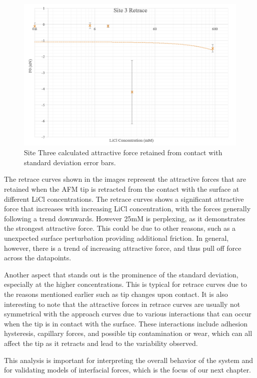 \begin{figure}
    \centering
    \includegraphics[width=1\linewidth]{chapter6/Overall/Site 3.png}
    \caption{Site Three calculated attractive force retained from contact with standard deviation error bars.}
    \label{fig:site3cont}
\end{figure}

The retrace curves shown in the images represent the attractive forces that are retained when the AFM tip is retracted from the contact with the surface at different LiCl concentrations. The retrace curves shows a significant attractive force that increases with increasing LiCl concentration, with the forces generally following a trend downwards. However 25mM is perplexing, as it demonstrates the strongest attractive force. This could be due to other reasons, such as a unexpected surface perturbation providing additional friction. In general, however, there is a trend of increasing attractive force, and thus pull off force across the datapoints.

Another aspect that stands out is the prominence of the standard deviation, especially at the higher concentrations. This is typical for retrace curves due to the reasons mentioned earlier such as tip changes upon contact. It is also interesting to note that the attractive forces in retrace curves are usually not symmetrical with the approach curves due to various interactions that can occur when the tip is in contact with the surface. These interactions include adhesion hysteresis, capillary forces, and possible tip contamination or wear, which can all affect the tip as it retracts and lead to the variability observed.

This  analysis is important for interpreting the overall behavior of the system and for validating models of interfacial forces, which is the focus of our next chapter.